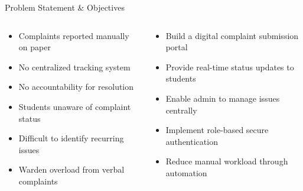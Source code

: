 \documentclass[aspectratio=169]{beamer}
\begin{document}
\begin{frame}{Problem Statement \& Objectives}{}
  \begin{columns}[t]
    \begin{tcolorbox}[enhanced, colback=red!5, colframe=red!50!NavyBlue,
        boxrule=0.5pt, arc=4pt, left=5pt, right=5pt, top=3pt, bottom=3pt,
        title={\color{white}\small\bfseries\faExclamationTriangle\quad Problems},
        colbacktitle=red!60!NavyBlue,
        fontupper=\small\color{DarkText}]
      \begin{itemize}\setlength\itemsep{0.22em}
        \item Complaints reported manually on paper
        \item No centralized tracking system
        \item No accountability for resolution
        \item Students unaware of complaint status
        \item Difficult to identify recurring issues
        \item Warden overload from verbal complaints
      \end{itemize}
    \end{tcolorbox}

    \begin{tcolorbox}[enhanced, colback=SuccessGreen!6, colframe=SuccessGreen!70,
        boxrule=0.5pt, arc=4pt, left=5pt, right=5pt, top=3pt, bottom=3pt,
        title={\color{white}\small\bfseries\faBullseye\quad Objectives},
        colbacktitle=TealPrimary,
        fontupper=\small\color{DarkText}]
      \begin{itemize}\setlength\itemsep{0.22em}
        \item Build a digital complaint submission portal
        \item Provide real-time status updates to students
        \item Enable admin to manage issues centrally
        \item Implement role-based secure authentication
       
        \item Reduce manual workload through automation
      \end{itemize}
    \end{tcolorbox}
  \end{columns}
\end{frame}
\end{document}
